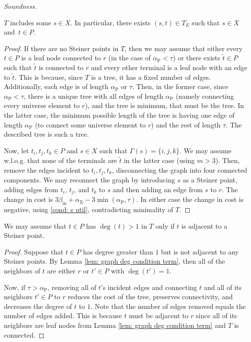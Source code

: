 \documentclass{theoretics}
\newcommand{\1}{\textbf{1}}
\newcommand{\td}{\tau}
\newcommand{\srd}{\alpha_{\text{X}}}
\newcommand{\trd}{\alpha_{\text{P}}}
\renewcommand{\tilde}{\widetilde}
\begin{document}
\begin{paragraph}{\textit{Soundness.}}
 \begin{lemma} \label{lem: graph st existence}
 $T$ includes some $s \in X$. In particular, there exists $(s,t) \in T_E$ such that $s \in X$ and~$t \in P$.
 \end{lemma}
 \begin{proof}
 If there are no Steiner points in $T$, then we may assume that either every $t \in P$ is a leaf node connected to $r$ (in the case of $\trd < \td$) or there exists $\tilde{t} \in P$ such that $\tilde{t}$ is connected to $r$ and every other terminal is a leaf node with an edge to $\tilde{t}$. This is because, since $T$ is a tree, it has a fixed number of edges. Additionally, each edge is of length $\trd$ or $\td$. Then, in the former case, since $\trd < \td$, there is a unique tree with all edges of length $\trd$ (namely connecting every universe element to $r$), and the tree is minimum, that must be the tree. In the latter case, the minimum possible length of the tree is having one edge of length $\trd$ (to connect some universe element to $r$) and the rest of length $\td$. The described tree is such a tree. 
 
 Now, let $t_i, t_j, t_k \in P$ and $s \in X$ such that $\Gamma(s) = \{i,j,k\}$. We may assume w.l.o.g. that none of the terminals are $\tilde{t}$ in the latter case (using $m >3$). Then, remove the edges incident to $t_i, t_j, t_k$, disconnecting the graph into four connected components. We may reconnect the graph by introducing $s$ as a Steiner point, adding edges from $t_i$, $t_j$, and $t_k$ to $s$ and then adding an edge from $s$ to $r$. The change in cost is $3\beta_{\text{in}} + \srd - 3\min(\trd, \td)$. In either case the change in cost is negative, using \ref{cond: s util}, contradicting minimality of $T$.
 \end{proof}
 

  \begin{lemma} \label{lem: graph term leaf node}
 We may assume that $t \in P$ has $\deg(t) >1$ in $T$ only if $t$ is adjacent to a Steiner point.
 \end{lemma}
 \begin{proof}
  Suppose that $t \in P$ has degree greater than $1$ but is not adjacent to any Steiner points. By Lemma \ref{lem: graph deg condition term}, then all of the neighbors of $t$ are either $r$ or $t' \in P$ with $\deg(t') = 1$. 
  
  Now, if $\td > \trd$, removing all of $t$'s incident edges and connecting $t$ and all of its neighbors $t' \in P$ to $r$ reduces the cost of the tree, preserves connectivity, and decreases the degree of $t$ to $1$. Note that the number of edges removed equals the number of edges added. This is because $t$ must be adjacent to $r$ since all of its neighbors are leaf nodes from Lemma \ref{lem: graph deg condition term} and $T$ is connected.
  

\end{proof}
\end{paragraph}
\end{document}

